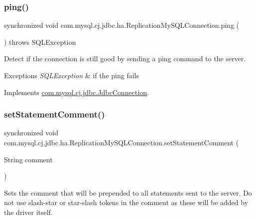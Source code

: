 \subsubsection{\texorpdfstring{ping()}{ping()}}
{\footnotesize\ttfamily synchronized void com.\+mysql.\+cj.\+jdbc.\+ha.\+Replication\+My\+S\+Q\+L\+Connection.\+ping (\begin{DoxyParamCaption}{ }\end{DoxyParamCaption}) throws S\+Q\+L\+Exception}

Detect if the connection is still good by sending a ping command to the server.


\begin{DoxyExceptions}{Exceptions}
{\em S\+Q\+L\+Exception} & if the ping fails \\
\hline
\end{DoxyExceptions}


Implements \mbox{\hyperlink{interfacecom_1_1mysql_1_1cj_1_1jdbc_1_1_jdbc_connection_a6d078258f83ddc438d64bafb0f665004}{com.\+mysql.\+cj.\+jdbc.\+Jdbc\+Connection}}.

\mbox{\label{classcom_1_1mysql_1_1cj_1_1jdbc_1_1ha_1_1_replication_my_s_q_l_connection_a7afc9e0c6196c0acd9f60ca99c5e7b8a}} 
\subsubsection{\texorpdfstring{set\+Statement\+Comment()}{setStatementComment()}}
{\footnotesize\ttfamily synchronized void com.\+mysql.\+cj.\+jdbc.\+ha.\+Replication\+My\+S\+Q\+L\+Connection.\+set\+Statement\+Comment (\begin{DoxyParamCaption}\item[{String}]{comment }\end{DoxyParamCaption})}

Sets the comment that will be prepended to all statements sent to the server. Do not use slash-\/star or star-\/slash tokens in the comment as these will be added by the driver itself.


